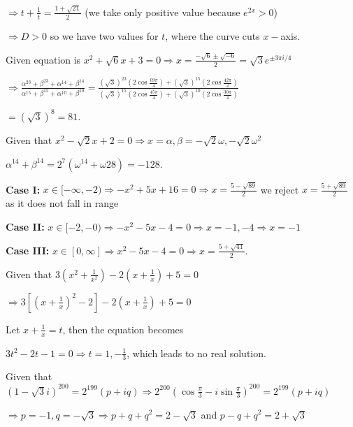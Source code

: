   $\Rightarrow t + \frac{1}{t} = \frac{1 + \sqrt{21}}{2}$ (we take only positive value because $e^{2x} > 0$)

  $\Rightarrow D > 0$ so we have two values for $t$, where the curve cuts $x-$axis.
\item Given equation is $x^2 + \sqrt{6}x + 3 = 0 \Rightarrow x = \frac{-\sqrt{6}\pm\sqrt{-6}}{2}
  = \sqrt{3}e^{\pm3\pi i/4}$

  $\Rightarrow \frac{\alpha^{23} + \beta^{23} + \alpha^{14} + \beta^{14}}{\alpha^{15} + \beta^{15}
    + \alpha^{10} + \beta^{10}} = \frac{\left(\sqrt{3}\right)^{23}\left(2\cos\frac{69\pi}{4}\right)
    + \left(\sqrt{3}\right)^{15}\left(2\cos\frac{42\pi}{4}\right)}{\left(\sqrt{3}\right)^{15}\left(2\cos\frac{45\pi}{4}\right)
    + \left(\sqrt{3}\right)^{10}\left(2\cos\frac{30\pi}{4}\right)}$

  $= \left(\sqrt{3}\right)^8 = 81$.
\item Given that $x^2 - \sqrt{2}x + 2 = 0 \Rightarrow x = \alpha, \beta = -\sqrt{2}\omega, -\sqrt{2}\omega^2$

  $\alpha^{14} + \beta^{14} = 2^7\left(\omega^{14} + \omega{28}\right) = -128$.
\item {\bf Case I:} $x\in[-\infty, -2)\Rightarrow -x^2 + 5x + 16 = 0\Rightarrow x = \frac{5 - \sqrt{89}}{2}$
  we reject $x = \frac{5 + \sqrt{89}}{2}$ as it does not fall in range

  {\bf Case II:} $x\in[-2, -0)\Rightarrow -x^2 - 5x - 4 = 0\Rightarrow x = -1, -4\Rightarrow x = -1$

  {\bf Case III:} $x\in[0, \infty]\Rightarrow x^2 - 5x - 4 = 0\Rightarrow x = \frac{5 + \sqrt{41}}{2}$.
\item Given that $3\left(x^2 + \frac{1}{x^2}\right) - 2\left(x + \frac{1}{x}\right) + 5  = 0$

  $\Rightarrow 3\left[\left(x + \frac{1}{x}\right)^2 - 2\right] - 2\left(x + \frac{1}{x}\right) + 5 = 0$

  Let $x + \frac{1}{x} = t$, then the equation becomes

  $3t^2 - 2t - 1 = 0 \Rightarrow t = 1, -\frac{1}{3}$, which leads to no real solution.
\item Given that $\left(1 - \sqrt{3}i\right)^{200} = 2^{199}(p + iq)\Rightarrow
  2^{200}\left(\cos\frac{\pi}{3} - i\sin\frac{\pi}{3}\right)^{200} = 2^{199}(p + iq)$

  $\Rightarrow p = -1, q = -\sqrt{3}\Rightarrow p + q + q^2 = 2 - \sqrt{3}$ and $p - q + q^2 = 2 + \sqrt{3}$

